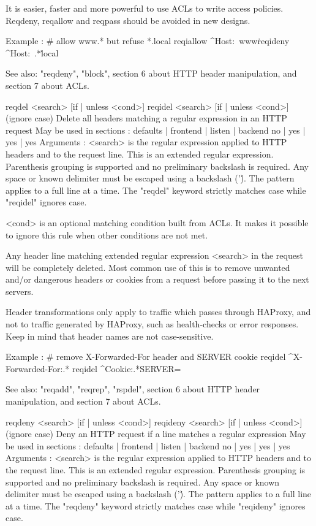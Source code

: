   It is easier, faster and more powerful to use ACLs to write access policies.
  Reqdeny, reqallow and reqpass should be avoided in new designs.

  Example :
     # allow www.* but refuse *.local
     reqiallow ^Host:\ www\.
     reqideny  ^Host:\ .*\.local

  See also: "reqdeny", "block", section 6 about HTTP header manipulation, and
            section 7 about ACLs.


reqdel  <search> [{if | unless} <cond>]
reqidel <search> [{if | unless} <cond>]  (ignore case)
  Delete all headers matching a regular expression in an HTTP request
  May be used in sections :   defaults | frontend | listen | backend
                                 no    |    yes   |   yes  |   yes
  Arguments :
    <search>  is the regular expression applied to HTTP headers and to the
              request line. This is an extended regular expression. Parenthesis
              grouping is supported and no preliminary backslash is required.
              Any space or known delimiter must be escaped using a backslash
              ('\'). The pattern applies to a full line at a time. The "reqdel"
              keyword strictly matches case while "reqidel" ignores case.

    <cond>    is an optional matching condition built from ACLs. It makes it
              possible to ignore this rule when other conditions are not met.

  Any header line matching extended regular expression <search> in the request
  will be completely deleted. Most common use of this is to remove unwanted
  and/or dangerous headers or cookies from a request before passing it to the
  next servers.

  Header transformations only apply to traffic which passes through HAProxy,
  and not to traffic generated by HAProxy, such as health-checks or error
  responses. Keep in mind that header names are not case-sensitive.

  Example :
     # remove X-Forwarded-For header and SERVER cookie
     reqidel ^X-Forwarded-For:.*
     reqidel ^Cookie:.*SERVER=

  See also: "reqadd", "reqrep", "rspdel", section 6 about HTTP header
            manipulation, and section 7 about ACLs.


reqdeny  <search> [{if | unless} <cond>]
reqideny <search> [{if | unless} <cond>]  (ignore case)
  Deny an HTTP request if a line matches a regular expression
  May be used in sections :   defaults | frontend | listen | backend
                                 no    |    yes   |   yes  |   yes
  Arguments :
    <search>  is the regular expression applied to HTTP headers and to the
              request line. This is an extended regular expression. Parenthesis
              grouping is supported and no preliminary backslash is required.
              Any space or known delimiter must be escaped using a backslash
              ('\'). The pattern applies to a full line at a time. The
              "reqdeny" keyword strictly matches case while "reqideny" ignores
              case.

